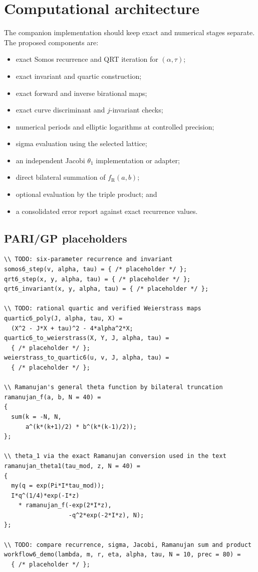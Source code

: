 \documentclass[11pt]{article}
\newcommand{\taupar}{\tau}
\newcommand{\RamF}{f_{\mathrm R}}
\begin{document}
\section{Computational architecture}
The companion implementation should keep exact and numerical stages separate.
The proposed components are:
\begin{itemize}[leftmargin=2em]
 \item exact Somos recurrence and QRT iteration for $(\alpha,\taupar)$;
 \item exact invariant and quartic construction;
 \item exact forward and inverse birational maps;
 \item exact curve discriminant and $j$-invariant checks;
 \item numerical periods and elliptic logarithms at controlled precision;
 \item sigma evaluation using the selected lattice;
 \item an independent Jacobi $\theta_1$ implementation or adapter;
 \item direct bilateral summation of $\RamF(a,b)$;
 \item optional evaluation by the triple product; and
 \item a consolidated error report against exact recurrence values.
\end{itemize}

\subsection{PARI/GP placeholders}
\begin{lstlisting}[style=parigp]
\\ TODO: six-parameter recurrence and invariant
somos6_step(v, alpha, tau) = { /* placeholder */ };
qrt6_step(x, y, alpha, tau) = { /* placeholder */ };
qrt6_invariant(x, y, alpha, tau) = { /* placeholder */ };

\\ TODO: rational quartic and verified Weierstrass maps
quartic6_poly(J, alpha, tau, X) =
  (X^2 - J*X + tau)^2 - 4*alpha^2*X;
quartic6_to_weierstrass(X, Y, J, alpha, tau) =
  { /* placeholder */ };
weierstrass_to_quartic6(u, v, J, alpha, tau) =
  { /* placeholder */ };

\\ Ramanujan's general theta function by bilateral truncation
ramanujan_f(a, b, N = 40) =
{
  sum(k = -N, N,
      a^(k*(k+1)/2) * b^(k*(k-1)/2));
};

\\ theta_1 via the exact Ramanujan conversion used in the text
ramanujan_theta1(tau_mod, z, N = 40) =
{
  my(q = exp(Pi*I*tau_mod));
  I*q^(1/4)*exp(-I*z)
    * ramanujan_f(-exp(2*I*z),
                  -q^2*exp(-2*I*z), N);
};

\\ TODO: compare recurrence, sigma, Jacobi, Ramanujan sum and product
workflow6_demo(lambda, m, r, eta, alpha, tau, N = 10, prec = 80) =
  { /* placeholder */ };
\end{lstlisting}
\end{document}
